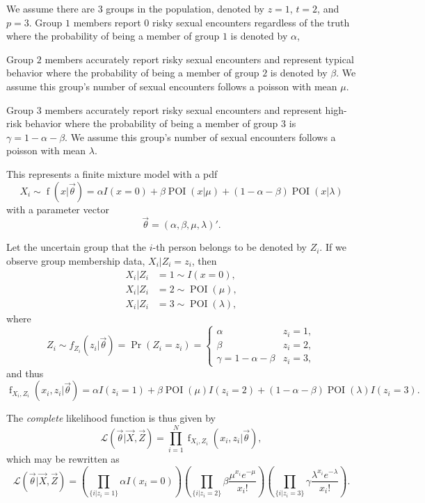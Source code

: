 \documentclass[
]{article}
\begin{document}
We assume there are \(3\) groups in the population, denoted by \(z=1\),
\(t=2\), and \(p=3\). Group \(1\) members report \(0\) risky sexual
encounters regardless of the truth where the probability of being a
member of group \(1\) is denoted by \(\alpha\),

Group \(2\) members accurately report risky sexual encounters and
represent typical behavior where the probability of being a member of
group \(2\) is denoted by \(\beta\). We assume this group's number of
sexual encounters follows a poisson with mean \(\mu\).

Group \(3\) members accurately report risky sexual encounters and
represent high-risk behavior where the probability of being a member of
group \(3\) is \(\gamma = 1-\alpha-\beta\). We assume this group's
number of sexual encounters follows a poisson with mean \(\lambda\).

This represents a finite mixture model with a pdf \[
  X_i \sim \operatorname{f}(x | \vec{\theta}) = \alpha I(x=0) +
    \beta \operatorname{POI}(x | \mu) + (1-\alpha-\beta)\operatorname{POI}(x | \lambda)
\] with a parameter vector \[
  \vec{\theta} = (\alpha,\beta,\mu,\lambda)'.
\]

Let the uncertain group that the \(i\)-th person belongs to be denoted
by \(Z_i\). If we observe group membership data, \(X_i | Z_i = z_i\),
then \begin{align}
  X_i | Z_i &= 1 \sim I(x=0),\\
  X_i | Z_i &= 2 \sim \operatorname{POI}(\mu),\\
  X_i | Z_i &= 3 \sim \operatorname{POI}(\lambda),
\end{align} where \[
  Z_i \sim f_{Z_i}(z_i | \vec{\theta}) = \Pr(Z_i=z_i) = 
  \begin{cases}
    \alpha                  & z_i = 1,\\
    \beta                   & z_i = 2,\\
    \gamma=1-\alpha-\beta   & z_i = 3,
  \end{cases}
\] and thus \[
  \operatorname{f}_{X_i,Z_i}(x_i,z_i | \vec{\theta}) =
    \alpha I(z_i = 1) + \beta \operatorname{POI}(\mu) I(z_i = 2) + (1-\alpha-\beta) \operatorname{POI}(\lambda) I(z_i=3).
\]

The \emph{complete} likelihood function is thus given by \[
  \mathcal{L}(\vec{\theta} | \vec{X}, \vec{Z}) = \prod_{i=1}^{N} \operatorname{f}_{X_i,Z_i}(x_i,z_i | \vec{\theta}),
\] which may be rewritten as \[
  \mathcal{L}(\vec{\theta} | \vec{X}, \vec{Z}) =
    \left(\prod_{\{i | z_i = 1\}} \alpha I(x_i=0)\right)
    \left(\prod_{\{i | z_i = 2\}} \beta \frac{\mu^{x_i} e^{-\mu}}{x_i!}\right)
    \left(\prod_{\{i | z_i = 3\}} \gamma \frac{\lambda^{x_i} e^{-\lambda}}{x_i!}\right).
\]
\end{document}
